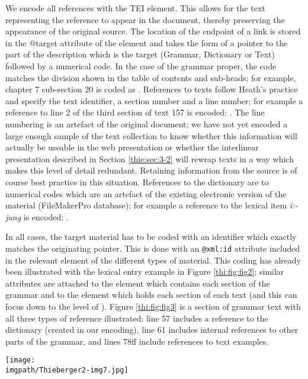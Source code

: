 We encode all references with the TEI  element. This allows for the text representing the reference to appear in the document, thereby preserving the appearance of the original source. The location of the endpoint of a link is stored in the @target attribute of the   element and takes the form of a pointer to the part of the description which is the target (Grammar, Dictionary or Text) followed by a numerical code. In the case of the grammar proper, the code matches the division shown in the table of contents and sub-heads; for example, chapter 7 sub-section 20 is coded as  . References to texts follow Heath's practice and specify the text identifier, a section number and a line number; for example a reference to line 2 of the third section of text 157 is encoded:  . The line numbering is an artefact of the original document; we have not yet encoded a large enough sample of the text collection to know whether this information will actually be useable in the web presentation or whether the interlinear presentation described in Section \ref{thie:sec:3-2} will rewrap texts in a way which makes this level of detail redundant. Retaining information from the source is of course best practice in this situation. References to the dictionary are to numerical codes which are an artefact of the existing electronic version of the material (FileMakerPro database); for example a reference to the lexical item \textit{i:-jung} is encoded:  . 

In all cases, the target material has to be coded with an identifier which exactly matches the originating pointer. This is done with an \texttt{@xml:id} attribute included in the relevant element of the different types of material. This coding has already been illustrated with the lexical entry example in Figure \ref{thi:fig:fig2}; similar attributes are attached to the   element which contains each section of the grammar and to the element   which holds each section of each text (and this can focus down to the level of  ). Figure \ref{thi:fig:fig3} is a section of grammar text with all three types of reference illustrated: line 57 includes a reference to the dictionary (created in our encoding), line 61 includes internal references to other parts of the grammar, and lines 78ff include references to text examples. 

\begin{sidewaysfigure} 
\texttt{[image: \\imgpath/Thieberger2-img7.jpg]}
\caption{Section of encoded grammar (from Heath 1984, section 7.25)}
\label{thi:fig:fig3}
\end{sidewaysfigure}


